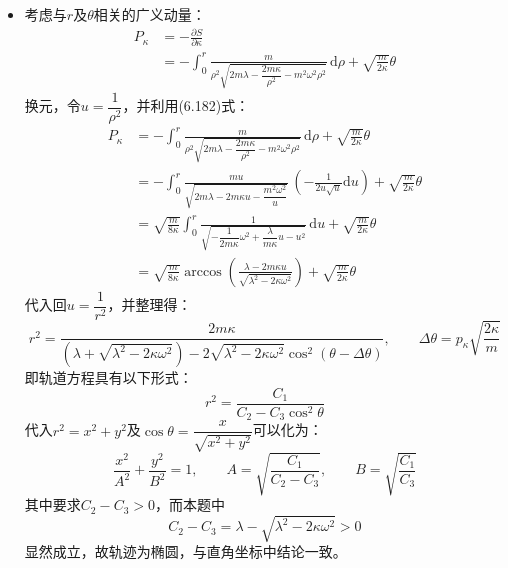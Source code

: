 \documentclass[a4paper,fontset=windows]{ctexart}
\begin{document}
\begin{itemize}
        \item[3.(h)]
        考虑与$r$及$\theta$相关的广义动量：
        \begin{align*}
            P_\kappa
            &= -\frac{\partial S}{\partial\kappa} \\
            &= -\int_0^r \frac{m}{\rho^2\sqrt{2m\lambda - \dfrac{2m\kappa}{\rho^2} - m^2 \omega^2 \rho^2}}\,\mathrm{d}\rho + \sqrt{\frac{m}{2\kappa}}\theta
        \end{align*}
        换元，令$u = \dfrac{1}{\rho^2}$，并利用(6.182)式：
        \begin{align*}
            P_\kappa
            &= -\int_0^r \frac{m}{\rho^2\sqrt{2m\lambda - \dfrac{2m\kappa}{\rho^2} - m^2 \omega^2 \rho^2}}\,\mathrm{d}\rho + \sqrt{\frac{m}{2\kappa}}\theta \\
            &= -\int_0^r \frac{mu}{\sqrt{2m\lambda - 2m\kappa u - \dfrac{m^2 \omega^2}{u}}}\,\left(-\frac{1}{2u\sqrt{u}}\mathrm{d}u\right) + \sqrt{\frac{m}{2\kappa}}\theta \\
            &= \sqrt{\frac{m}{8\kappa}} \int_0^r \frac{1}{\sqrt{-\dfrac{1}{2m\kappa}\omega^2 + \dfrac{\lambda}{m\kappa}u - u^2}}\,\mathrm{d}u + \sqrt{\frac{m}{2\kappa}}\theta \\
            &= \sqrt{\frac{m}{8\kappa}}\arccos\left(\frac{\lambda - 2m\kappa u}{\sqrt{\lambda^2 - 2\kappa\omega^2}}\right) + \sqrt{\frac{m}{2\kappa}}\theta
        \end{align*}
        代入回$u = \dfrac{1}{r^2}$，并整理得：
        \[
        r^2 = \frac{2m\kappa}{\left(\lambda + \sqrt{\lambda^2 - 2\kappa\omega^2}\right) - 2\sqrt{\lambda^2 - 2\kappa\omega^2}\cos^2(\theta - \Delta\theta)},\qquad \Delta\theta = p_\kappa\sqrt{\frac{2\kappa}{m}}
        \]
        即轨道方程具有以下形式：
        \[
        r^2 = \frac{C_1}{C_2 - C_3\cos^2\theta}
        \]
        代入$r^2 = x^2 + y^2$及$\cos\theta = \dfrac{x}{\sqrt{x^2 + y^2}}$可以化为：
        \[
        \frac{x^2}{A^2} + \frac{y^2}{B^2} = 1,\qquad A = \sqrt{\frac{C_1}{C_2 - C_3}},\qquad B = \sqrt{\frac{C_1}{C_3}}
        \]
        其中要求$C_2 - C_3 > 0$，而本题中
        \[
        C_2 - C_3 = \lambda - \sqrt{\lambda^2 - 2\kappa\omega^2} > 0
        \]
        显然成立，故轨迹为椭圆，与直角坐标中结论一致。
        \medskip


\end{itemize}
\end{document}
